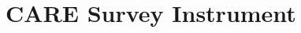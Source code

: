 \chapter{CARE Survey Instrument}
\label{app:care-survey}

\newcommand{\ratingTable}{
    \vspace{0.5em}
    \begin{center}
\begin{tabular}{c c c c c c}
    $\bigcirc$ & $\bigcirc$ & $\bigcirc$ & $\bigcirc$ & $\bigcirc$ & $\bigcirc$ \\
    
    {\small \hspace{1em} Poor \hspace{1em}} & 
    {\small \hspace{1em} Fair \hspace{1em}} &
    {\small \hspace{1em} Good \hspace{1em}} & 
    {\small \hspace{1em} Very Good \hspace{1em}} &
    {\small \hspace{1em} Excellent  \hspace{1em}} &
    {\small \hspace{1em} Does Not Apply \hspace{1em}} \\ 
\end{tabular}
\end{center}
    \vspace{1em}
}

